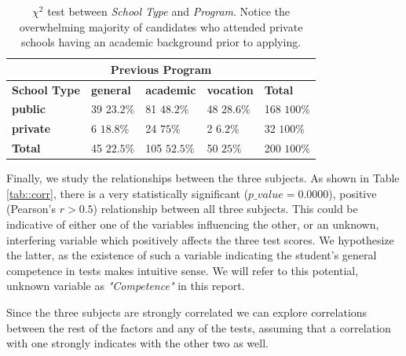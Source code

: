 \documentclass[10pt]{article}
\begin{document}
	\begin{table}
		\centering
		\begin{tabular}
			{ |p{2cm} | p{1.2cm} p{1.2cm} p{1.2cm} | p{1.2cm} | }
			\hline
			\multicolumn{5}{|c|}{\textbf{Previous Program}}\\
			\hline
			\textbf{School Type} & \textbf{general} & \textbf{academic} & \textbf{vocation} & \textbf{Total}\\
			\hline
			\textbf{public} & \makecell{39 \\ $23.2\%$} & \makecell{81 \\ $48.2\%$} & \makecell{48 \\ $28.6\%$} & \makecell{168 \\ $100\%$} \\
			\textbf{private} & \makecell{6 \\ $18.8\%$} & \makecell{24 \\ $75\%$} & \makecell{2 \\ $6.2\%$} & \makecell{32 \\ $100\%$}\\
			\hline
			\textbf{Total} & \makecell{45 \\ $22.5\%$} & \makecell{105 \\ $52.5\%$} & \makecell{50 \\ $25\%$} & \makecell{200 \\ $100\%$}\\
			\hline
		\end{tabular}
		\caption{$\chi^2$ test between \textit{School Type} and \textit{Program}. Notice the overwhelming majority of candidates who attended private schools having an academic background prior to applying.}
		\label{tab::chisq}
	\end{table}
	
	
	Finally, we study the relationships between the three subjects. As shown in Table \ref{tab::corr}, there is a very statistically significant ($p\_value = 0.0000$), positive (Pearson's $r > 0.5$) relationship between all three subjects. This could be indicative of either one of the variables influencing the other, or an unknown, interfering variable which positively affects the three test scores. We hypothesize the latter, as the existence of such a variable indicating the student's general competence in tests makes intuitive sense. We will refer to this potential, unknown variable as \textit{"Competence"} in this report.
	
	Since the three subjects are strongly correlated we can explore correlations between the rest of the factors and any of the tests, assuming that a correlation with one strongly indicates with the other two as well. 
	
\end{document}
